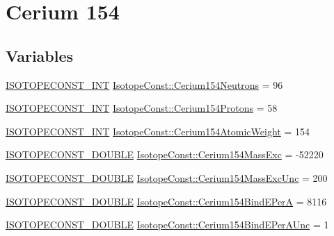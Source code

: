 \hypertarget{group___isotope_const-_cerium-_ce154}{}\section{Cerium 154}
\label{group___isotope_const-_cerium-_ce154}
\subsection*{Variables}
\begin{DoxyCompactItemize}
\item 
\mbox{\hyperlink{group___isotope_const-_macros_ga5f18360b3e99483a35c32d789e62621c}{I\+S\+O\+T\+O\+P\+E\+C\+O\+N\+S\+T\+\_\+\+I\+NT}} \mbox{\hyperlink{group___isotope_const-_cerium-_ce154_gad3710e5ec60c110d7b15beafa978ebbd}{Isotope\+Const\+::\+Cerium154\+Neutrons}} = 96
\item 
\mbox{\hyperlink{group___isotope_const-_macros_ga5f18360b3e99483a35c32d789e62621c}{I\+S\+O\+T\+O\+P\+E\+C\+O\+N\+S\+T\+\_\+\+I\+NT}} \mbox{\hyperlink{group___isotope_const-_cerium-_ce154_gaa2682eb8932ad15c5f3ddf087daa359c}{Isotope\+Const\+::\+Cerium154\+Protons}} = 58
\item 
\mbox{\hyperlink{group___isotope_const-_macros_ga5f18360b3e99483a35c32d789e62621c}{I\+S\+O\+T\+O\+P\+E\+C\+O\+N\+S\+T\+\_\+\+I\+NT}} \mbox{\hyperlink{group___isotope_const-_cerium-_ce154_gacd977611ecdf38995a8dfde9c7331bf0}{Isotope\+Const\+::\+Cerium154\+Atomic\+Weight}} = 154
\item 
\mbox{\hyperlink{group___isotope_const-_macros_ga8f45a7272ce02c0b4c65c44636ed719a}{I\+S\+O\+T\+O\+P\+E\+C\+O\+N\+S\+T\+\_\+\+D\+O\+U\+B\+LE}} \mbox{\hyperlink{group___isotope_const-_cerium-_ce154_ga4a34824d6b600831d2f940e7ec7045b8}{Isotope\+Const\+::\+Cerium154\+Mass\+Exc}} = -\/52220
\item 
\mbox{\hyperlink{group___isotope_const-_macros_ga8f45a7272ce02c0b4c65c44636ed719a}{I\+S\+O\+T\+O\+P\+E\+C\+O\+N\+S\+T\+\_\+\+D\+O\+U\+B\+LE}} \mbox{\hyperlink{group___isotope_const-_cerium-_ce154_ga9332d2cf6d010af698c83a32675fcd4f}{Isotope\+Const\+::\+Cerium154\+Mass\+Exc\+Unc}} = 200
\item 
\mbox{\hyperlink{group___isotope_const-_macros_ga8f45a7272ce02c0b4c65c44636ed719a}{I\+S\+O\+T\+O\+P\+E\+C\+O\+N\+S\+T\+\_\+\+D\+O\+U\+B\+LE}} \mbox{\hyperlink{group___isotope_const-_cerium-_ce154_gab4a5ca35d5610097d81fd53d8a6ca7f9}{Isotope\+Const\+::\+Cerium154\+Bind\+E\+PerA}} = 8116
\item 
\mbox{\hyperlink{group___isotope_const-_macros_ga8f45a7272ce02c0b4c65c44636ed719a}{I\+S\+O\+T\+O\+P\+E\+C\+O\+N\+S\+T\+\_\+\+D\+O\+U\+B\+LE}} \mbox{\hyperlink{group___isotope_const-_cerium-_ce154_gaf332e7a502fb4aab2de63c58dca5f581}{Isotope\+Const\+::\+Cerium154\+Bind\+E\+Per\+A\+Unc}} = 1

\end{DoxyCompactItemize}
